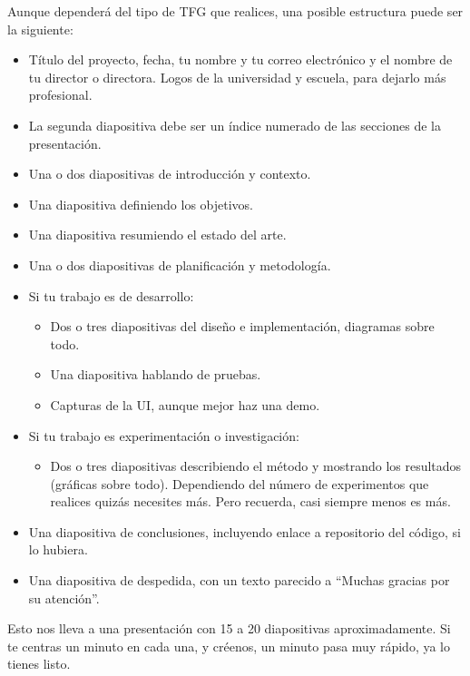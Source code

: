 Aunque dependerá del tipo de TFG que realices, una posible estructura puede ser la siguiente:
\begin{itemize}
\item Título del proyecto, fecha, tu nombre y tu correo electrónico y el nombre de tu director o directora. Logos de la universidad y escuela, para dejarlo más profesional.
\item La segunda diapositiva debe ser un índice numerado de las secciones de la presentación.
\item Una o dos diapositivas de introducción y contexto.
\item Una diapositiva definiendo los objetivos.
\item Una diapositiva resumiendo el estado del arte.
\item Una o dos diapositivas de planificación y metodología.
\item Si tu trabajo es de desarrollo:
    \begin{itemize}
    \item Dos o tres diapositivas del diseño e implementación, diagramas sobre todo.
    \item Una diapositiva hablando de pruebas.
    \item Capturas de la UI, aunque mejor haz una demo.
    \end{itemize}
\item Si tu trabajo es experimentación o investigación:
    \begin{itemize}
        \item Dos o tres diapositivas describiendo el método y mostrando los resultados (gráficas sobre todo). Dependiendo del número de experimentos que realices quizás necesites más. Pero recuerda, casi siempre menos es más.
    \end{itemize}
\item Una diapositiva de conclusiones, incluyendo enlace a repositorio del código, si lo hubiera.
\item Una diapositiva de despedida, con un texto parecido a ``Muchas gracias por su atención''.
\end{itemize}

Esto nos lleva a una presentación con 15 a 20 diapositivas aproximadamente. Si te centras un minuto en cada una, y créenos, un minuto pasa muy rápido, ya lo tienes listo.

